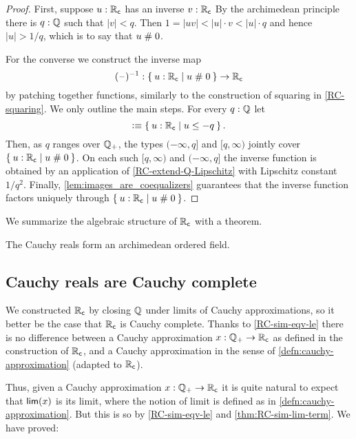 \begin{proof}
  First, suppose $u : \mathbb{R}_\mathsf{c}$ has an inverse $v : \mathbb{R}_\mathsf{c}$ By the archimedean principle there is $q :
  \mathbb{Q}$ such that $|v| < q$. Then $1 = |u v| < |u| \cdot v < |u| \cdot q$ and hence $|u| >
  1/q$, which is to say that $u \mathrel{\#} 0$.

  For the converse we construct the inverse map
  \begin{equation*}
    ({\blank})^{-1} : \setof{ u : \RC | u \apart 0 } \to \RC
  \end{equation*}
  by patching together functions, similarly to the construction of squaring in
  \autoref{RC-squaring}. We only outline the main steps. For every $q : \mathbb{Q}$ let
  \begin{equation*}
    [q, \infty) \defeq \setof{u : \RC | q \leq u}
    \qquad\text{and}\qquad
    (-\infty, q] \defeq \setof{u : \RC | u \leq -q}.
  \end{equation*}
  Then, as $q$ ranges over $\mathbb{Q}_{+}$, the types $(-\infty, q]$ and $[q, \infty)$ jointly cover
  $\setof{u : \RC | u \apart 0}$. On each such $[q, \infty)$ and $(-\infty, q]$ the
  inverse function is obtained by an application of \autoref{RC-extend-Q-Lipschitz}
  with Lipschitz constant $1/q^2$. Finally, \autoref{lem:images_are_coequalizers}
  guarantees that the inverse function factors uniquely through $\setof{ u : \RC | u
    \apart 0 }$.
\end{proof}

We summarize the algebraic structure of $\mathbb{R}_\mathsf{c}$ with a theorem.

\begin{thm} \label{RC-archimedean-ordered-field}
  The Cauchy reals form an archimedean ordered field.
\end{thm}

\subsection{Cauchy reals are Cauchy complete}
\label{sec:cauchy-reals-cauchy-complete}

We constructed $\mathbb{R}_\mathsf{c}$ by closing $\mathbb{Q}$ under limits of Cauchy approximations, so it better
be the case that $\mathbb{R}_\mathsf{c}$ is Cauchy complete. Thanks to \autoref{RC-sim-eqv-le} there is no
difference between a Cauchy approximation $x : \mathbb{Q}_{+} \to \mathbb{R}_\mathsf{c}$ as defined in the construction
of $\mathbb{R}_\mathsf{c}$, and a Cauchy approximation in the sense of \autoref{defn:cauchy-approximation}
(adapted to $\mathbb{R}_\mathsf{c}$).

Thus, given a Cauchy approximation $x : \mathbb{Q}_{+} \to \mathbb{R}_\mathsf{c}$ it is quite natural to expect that
$\mathsf{lim}(x)$ is its limit, where the notion of limit is defined as in
\autoref{defn:cauchy-approximation}. But this is so by \autoref{RC-sim-eqv-le} and
\autoref{thm:RC-sim-lim-term}. We have proved:

